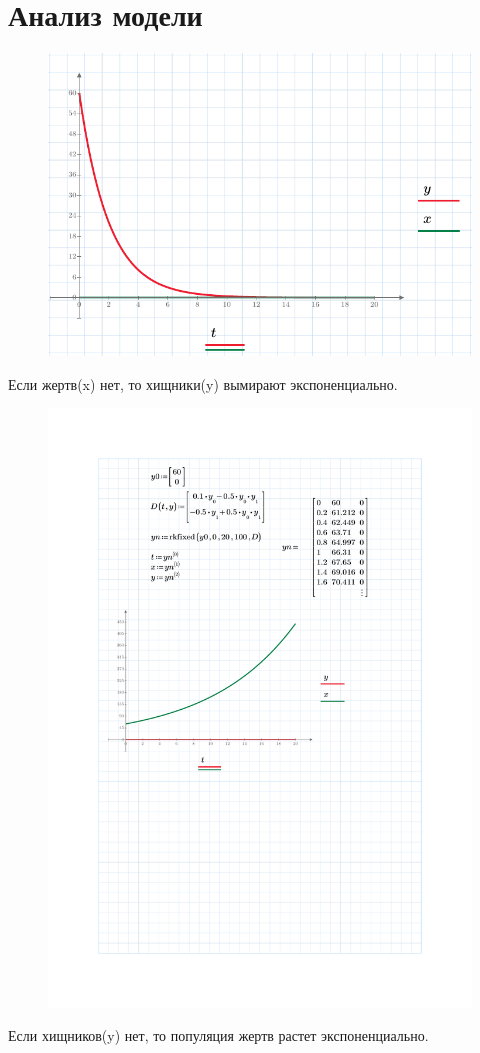 \documentclass[a4paper, 14pt]{extarticle}
\begin{document}
	\section{Анализ модели}
		\begin{figure}[H]
			\centering
			\includegraphics[width = \linewidth]{1.pdf}
			\caption[.] {}
		\end{figure}
		Если жертв(x) нет, то хищники(y) вымирают экспоненциально.
	
		\begin{figure}[H]
			\centering
			\includegraphics[width = \linewidth]{2.pdf}
			\caption[.] {}
		\end{figure}
		Если хищников(y) нет, то популяция жертв растет экспоненциально. 
		\pagebreak
		
\end{document}
